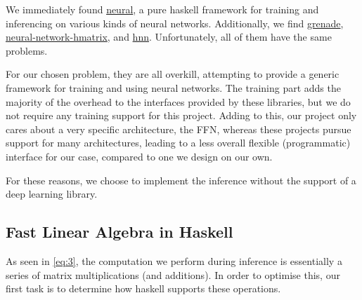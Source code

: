 \documentclass[12pt, titlepage]{article}
\begin{document}
We immediately found \href{https://hackage.haskell.org/package/neural}{neural}, a pure haskell framework for training and inferencing on various kinds of neural networks. Additionally, we find \href{https://github.com/HuwCampbell/grenade}{grenade}, \href{https://hackage.haskell.org/package/neural-network-hmatrix}{neural-network-hmatrix}, and \href{https://hackage.haskell.org/package/hnn}{hnn}. Unfortunately, all of them have the same problems.\bigskip

For our chosen problem, they are all overkill, attempting to provide a generic framework for training and using neural networks. The training part adds the majority of the overhead to the interfaces provided by these libraries, but we do not require any training support for this project. Adding to this, our project only cares about a very specific architecture, the FFN, whereas these projects pursue support for many architectures, leading to a less overall flexible (programmatic) interface for our case, compared to one we design on our own.\bigskip

For these reasons, we choose to implement the inference without the support of a deep learning library.

\subsection{Fast Linear Algebra in Haskell} \label{sec:3.2}
As seen in \eqref{eq:3}, the computation we perform during inference is essentially a series of matrix multiplications (and additions). In order to optimise this, our first task is to determine how haskell supports these operations.\bigskip
\end{document}
